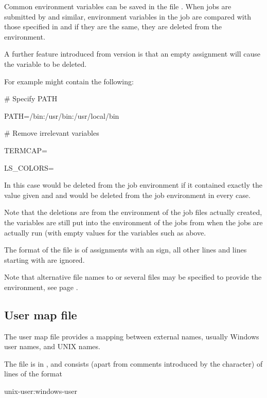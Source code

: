 Common environment variables can be saved in the file \batchenv. When jobs are submitted by \PrBtr{} and similar, environment variables in the job are
compared with those specified in \batchenv{} and if they are the same, they are deleted from the environment.

A further feature introduced from \ProductName{} version   is that an empty assignment will cause the variable to be deleted.

For example \batchenv{} might contain the following:

\begin{expara}

\# Specify PATH

PATH=/bin:/usr/bin:/usr/local/bin

\# Remove irrelevant variables

TERMCAP=

LS\_COLORS=

\end{expara}

In this case  would be deleted from the job environment if it contained exactly the value given and  and
 would be deleted from the job environment in every case.

Note that the deletions are from the environment of the job files actually created, the variables are still put into the environment of the jobs from
\batchenv{} when the jobs are actually run (with empty values for the variables such as  above.

The format of the file is of assignments with an \filename{=} sign, all other lines and lines starting with \filename{\#} are ignored.

Note that alternative file names to \batchenv{} or several files may be specified to provide the environment, see page \pageref{SEfiles}.

\subsection{User map file}
The user map file provides a mapping between external names, usually Windows user names, and UNIX names.

The file is in \usermap, and consists (apart from comments introduced by the \filename{\#} character) of lines of the format

\begin{expara}

unix-user:windows-user

\end{expara}

